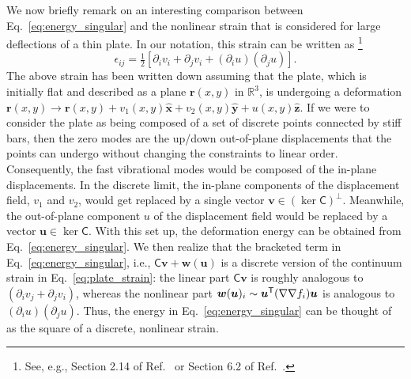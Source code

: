 We now briefly remark on an interesting comparison between Eq.~\eqref{eq:energy_singular} and the nonlinear strain that is considered for large deflections of a thin plate.
In our notation, this strain can be written as%
\footnote{See, e.g., Section 2.14 of Ref.~\cite{landau1986} or Section 6.2 of Ref.~\cite{nelson2004}.}
%
\begin{equation}
  \epsilon_{ij} = \tfrac{1}{2}\left[\partial_{i}v_{i} + \partial_{j}v_{i} + (\partial_{i}u)(\partial_{j}u)\right].
  \label{eq:plate_strain}
\end{equation}
%
The above strain has been written down assuming that the plate, which is initially flat and described as a plane $\bm{r}(x, y)$ in $\mathbb{R}^{3}$, is undergoing a deformation $\bm{r}(x, y) \to \bm{r}(x, y) + v_{1}(x, y)\hat{\bm{x}} + v_{2}(x, y)\hat{\bm{y}} + u(x, y)\hat{\bm{z}}$.
If we were to consider the plate as being composed of a set of discrete points connected by stiff bars, then the zero modes are the up/down out-of-plane displacements that the points can undergo without changing the constraints to linear order.
Consequently, the fast vibrational modes would be composed of the in-plane displacements.
In the discrete limit, the in-plane components of the displacement field, $v_{1}$ and $v_{2}$, would get replaced by a single vector $\bm{v} \in (\ker\mathsf{C})^{\perp}$.
Meanwhile, the out-of-plane component $u$ of the displacement field would be replaced by a vector $\bm{u} \in \ker\mathsf{C}$.
With this set up, the deformation energy can be obtained from Eq.~\eqref{eq:energy_singular}.
We then realize that the bracketed term in Eq.~\eqref{eq:energy_singular}, i.e., $\mathsf{C}\bm{v} + \bm{w}(\bm{u})$ is a discrete version of the continuum strain in Eq.~\eqref{eq:plate_strain}:
the linear part $\mathsf{C}\bm{v}$ is roughly analogous to $(\partial_{i}v_{j} + \partial_{j}v_{i})$, whereas the nonlinear part $\bm{w}(\bm{u})_{i} \sim \bm{u}^\mathsf{T}(\nabla\nabla f_{i})\bm{u}$ is analogous to $(\partial_{i} u)(\partial_{j} u)$.
Thus, the energy in Eq.~\eqref{eq:energy_singular} can be thought of as the square of a discrete, nonlinear strain.
